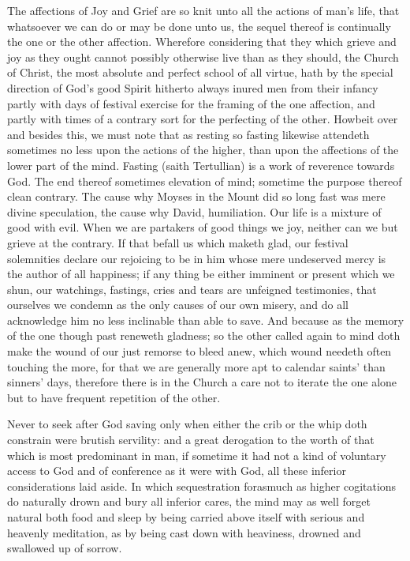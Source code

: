 The affections of Joy and Grief are so knit unto all the actions of man’s life, that whatsoever we can do or may be done unto us, the sequel thereof is continually the one or the other affection. Wherefore considering that they which  grieve and joy as they ought cannot possibly otherwise live than as they should, the Church of Christ, the most absolute and perfect school of all virtue, hath by the special direction of God’s good Spirit hitherto always inured men from their infancy partly with days of festival exercise for the framing of the one affection, and partly with times of a contrary sort for the perfecting of the other. Howbeit over and besides this, we must note that as resting so fasting likewise attendeth sometimes no less upon the actions of the higher, than upon the affections of the lower part of the mind. Fasting (saith Tertullian) is a work of reverence towards God. The end thereof sometimes elevation of mind; sometime the purpose thereof clean contrary. The cause why Moyses in the Mount did so long fast was mere divine speculation, the cause why David, humiliation. Our life is a mixture of good with evil. When we are partakers of good things we joy, neither can we but grieve at the contrary. If that befall us which maketh glad, our festival solemnities declare our rejoicing to be in him whose mere undeserved mercy is the author of all happiness; if any thing be either imminent or present which we shun, our watchings, fastings, cries and tears are unfeigned testimonies, that ourselves we condemn as the only causes of our own misery, and do all acknowledge him no less inclinable than able to save. And because as the memory of the one  though past reneweth gladness;
 so the other called again to mind doth make the wound of our just remorse to bleed anew, which wound needeth often touching the more, for that we are generally more apt to calendar saints’ than sinners’ days, therefore there is in the Church a care not to iterate the one alone but to have frequent repetition of the other.

Never to seek after God saving only when either the crib or the whip doth constrain were brutish servility: and a great derogation to the worth of that which is most predominant in man, if sometime it had not a kind of voluntary access to God and of conference as it were with God, all these inferior considerations laid aside. In which sequestration forasmuch as higher cogitations do naturally drown and bury all inferior cares, the mind may as well forget natural both food and sleep by being carried above itself with serious and heavenly meditation, as by being cast down with heaviness, drowned and swallowed up of sorrow.

